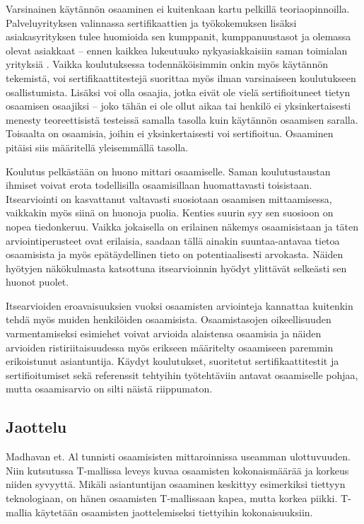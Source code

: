 \documentclass[a4paper,finnish,12pt]{article}
\begin{document}
Varsinainen käytännön osaaminen ei kuitenkaan kartu pelkillä teoriaopinnoilla. Palveluyrityksen valinnassa sertifikaattien ja työkokemuksen lisäksi asiakasyrityksen tulee huomioida sen kumppanit, kumppanuustasot ja olemassa olevat asiakkaat  -- ennen kaikkea lukeutuuko nykyasiakkaisiin saman toimialan yrityksiä \cite{ICT-haasteet}. Vaikka koulutuksessa todennäköisimmin onkin myös käytännön tekemistä, voi sertifikaattitestejä suorittaa myös ilman varsinaiseen koulutukseen osallistumista. Lisäksi voi olla osaajia, jotka eivät ole vielä sertifioituneet tietyn osaamisen osaajiksi -- joko tähän ei ole ollut aikaa tai henkilö ei yksinkertaisesti menesty teoreettisistä testeissä samalla tasolla kuin käytännön osaamisen saralla. Toisaalta on osaamisia, joihin ei yksinkertaisesti voi sertifioitua. Osaaminen pitäisi siis määritellä yleisemmällä tasolla.

Koulutus pelkästään on huono mittari osaamiselle. Saman koulutustaustan ihmiset voivat erota todellisilla osaamisillaan huomattavasti toisistaan. Itsearviointi on kasvattanut valtavasti suosiotaan osaamisen mittaamisessa, vaikkakin myös siinä on huonoja puolia. Kenties suurin syy sen suosioon on nopea tiedonkeruu. Vaikka jokaisella on erilainen näkemys osaamisistaan ja täten arviointiperusteet ovat erilaisia, saadaan tällä ainakin suuntaa-antavaa tietoa osaamisista ja myös epätäydellinen tieto on potentiaalisesti arvokasta. Näiden hyötyjen näkökulmasta katsottuna itsearvioinnin hyödyt ylittävät selkeästi sen huonot puolet. \cite{self-assessment_in_skill_measurement}

Itsearvioiden eroavaisuuksien vuoksi osaamisten arviointeja kannattaa kuitenkin tehdä myös muiden henkilöiden osaamisista. Osaamistasojen oikeellisuuden varmentamiseksi esimiehet voivat arvioida alaistensa osaamisia ja näiden arvioiden ristiriitaisuudessa myös erikseen määritelty osaamiseen paremmin erikoistunut asiantuntija. Käydyt koulutukset, suoritetut sertifikaattitestit ja sertifioitumiset sekä referenssit tehtyihin työtehtäviin antavat osaamiselle pohjaa, mutta osaamisarvio on silti näistä riippumaton.

\subsection{Jaottelu}

Madhavan et. Al tunnisti osaamisisten mittaroinnissa useamman ulottuvuuden. Niin kutsutussa T-mallissa leveys kuvaa osaamisten kokonaismäärää ja korkeus niiden syvyyttä. Mikäli asiantuntijan osaaminen keskittyy esimerkiksi tiettyyn teknologiaan, on hänen osaamisten T-mallissaan kapea, mutta korkea piikki. T-mallia käytetään osaamisten jaottelemiseksi tiettyihin kokonaisuuksiin. \cite{ICT-haasteet}
\end{document}
